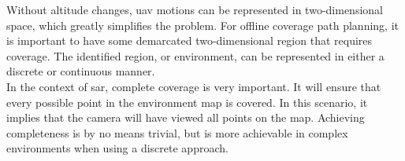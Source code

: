 Without altitude changes, \acs{uav} motions can be represented in two-dimensional space, which greatly simplifies the problem. For offline coverage path planning, it is important to have some demarcated two-dimensional region that requires coverage. The identified region, or environment, can be represented in either a discrete or continuous manner. \\
In the context of \acs{sar}, complete coverage is very important. It will ensure that every possible point in the environment map is covered. In this scenario, it implies that the camera will have viewed all points on the map. Achieving completeness is by no means trivial, but is more achievable in complex environments when using a discrete approach. \\
